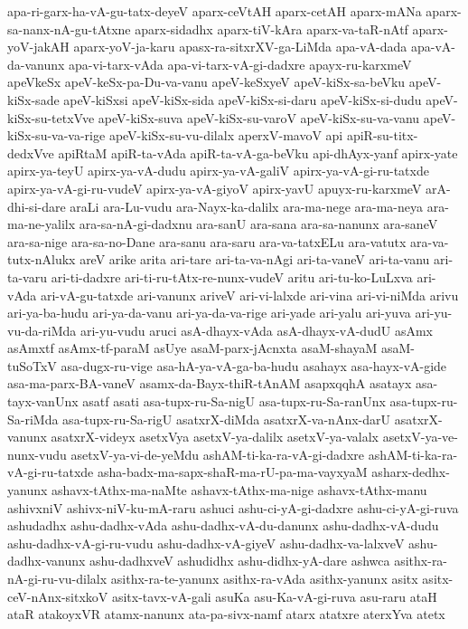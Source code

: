 {apa-ri-garx-ha-vA-gu-tatx-deyeV
aparx-ceVtAH
aparx-cetAH
aparx-mANa
aparx-sa-nanx-nA-gu-tAtxne
aparx-sidadhx
aparx-tiV-kAra
aparx-va-taR-nAtf
aparx-yoV-jakAH
aparx-yoV-ja-karu
apasx-ra-sitxrXV-ga-LiMda
apa-vA-dada
apa-vA-da-vanunx
apa-vi-tarx-vAda
apa-vi-tarx-vA-gi-dadxre
apayx-ru-karxmeV
apeVkeSx
apeV-keSx-pa-Du-va-vanu
apeV-keSxyeV
apeV-kiSx-sa-beVku
apeV-kiSx-sade
apeV-kiSxsi
apeV-kiSx-sida
apeV-kiSx-si-daru
apeV-kiSx-si-dudu
apeV-kiSx-su-tetxVve
apeV-kiSx-suva
apeV-kiSx-su-varoV
apeV-kiSx-su-va-vanu
apeV-kiSx-su-va-va-rige
apeV-kiSx-su-vu-dilalx
aperxV-mavoV
api
apiR-su-titx-dedxVve
apiRtaM
apiR-ta-vAda
apiR-ta-vA-ga-beVku
api-dhAyx-yanf
apirx-yate
apirx-ya-teyU
apirx-ya-vA-dudu
apirx-ya-vA-galiV
apirx-ya-vA-gi-ru-tatxde
apirx-ya-vA-gi-ru-vudeV
apirx-ya-vA-giyoV
apirx-yavU
apuyx-ru-karxmeV
arA-dhi-si-dare
araLi
ara-Lu-vudu
ara-Nayx-ka-dalilx
ara-ma-nege
ara-ma-neya
ara-ma-ne-yalilx
ara-sa-nA-gi-dadxnu
ara-sanU
ara-sana
ara-sa-nanunx
ara-saneV
ara-sa-nige
ara-sa-no-Dane
ara-sanu
ara-saru
ara-va-tatxELu
ara-vatutx
ara-va-tutx-nAlukx
areV
arike
arita
ari-tare
ari-ta-va-nAgi
ari-ta-vaneV
ari-ta-vanu
ari-ta-varu
ari-ti-dadxre
ari-ti-ru-tAtx-re-nunx-vudeV
aritu
ari-tu-ko-LuLxva
ari-vAda
ari-vA-gu-tatxde
ari-vanunx
ariveV
ari-vi-lalxde
ari-vina
ari-vi-niMda
arivu
ari-ya-ba-hudu
ari-ya-da-vanu
ari-ya-da-va-rige
ari-yade
ari-yalu
ari-yuva
ari-yu-vu-da-riMda
ari-yu-vudu
aruci
asA-dhayx-vAda
asA-dhayx-vA-dudU
asAmx
asAmxtf
asAmx-tf-paraM
asUye
asaM-parx-jAcnxta
asaM-shayaM
asaM-tuSoTxV
asa-dugx-ru-vige
asa-hA-ya-vA-ga-ba-hudu
asahayx
asa-hayx-vA-gide
asa-ma-parx-BA-vaneV
asamx-da-Bayx-thiR-tAnAM
asapxqqhA
asatayx
asa-tayx-vanUnx
asatf
asati
asa-tupx-ru-Sa-nigU
asa-tupx-ru-Sa-ranUnx
asa-tupx-ru-Sa-riMda
asa-tupx-ru-Sa-rigU
asatxrX-diMda
asatxrX-va-nAnx-darU
asatxrX-vanunx
asatxrX-videyx
asetxVya
asetxV-ya-dalilx
asetxV-ya-valalx
asetxV-ya-ve-nunx-vudu
asetxV-ya-vi-de-yeMdu
ashAM-ti-ka-ra-vA-gi-dadxre
ashAM-ti-ka-ra-vA-gi-ru-tatxde
asha-badx-ma-sapx-shaR-ma-rU-pa-ma-vayxyaM
asharx-dedhx-yanunx
ashavx-tAthx-ma-naMte
ashavx-tAthx-ma-nige
ashavx-tAthx-manu
ashivxniV
ashivx-niV-ku-mA-raru
ashuci
ashu-ci-yA-gi-dadxre
ashu-ci-yA-gi-ruva
ashudadhx
ashu-dadhx-vAda
ashu-dadhx-vA-du-danunx
ashu-dadhx-vA-dudu
ashu-dadhx-vA-gi-ru-vudu
ashu-dadhx-vA-giyeV
ashu-dadhx-va-lalxveV
ashu-dadhx-vanunx
ashu-dadhxveV
ashudidhx
ashu-didhx-yA-dare
ashwca
asithx-ra-nA-gi-ru-vu-dilalx
asithx-ra-te-yanunx
asithx-ra-vAda
asithx-yanunx
asitx
asitx-ceV-nAnx-sitxkoV
asitx-tavx-vA-gali
asuKa
asu-Ka-vA-gi-ruva
asu-raru
ataH
ataR
atakoyxVR
atamx-nanunx
ata-pa-sivx-namf
atarx
atatxre
aterxYva
atetx
}
